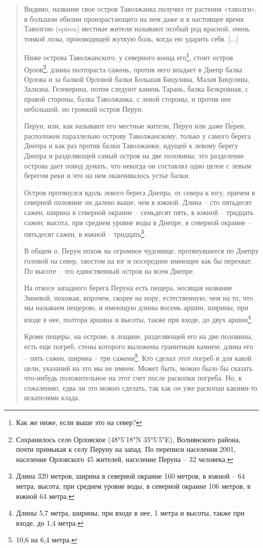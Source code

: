 \begin{quotation}
Видимо, название свое остров Таволжанка получил от растения «таволги», в большом обилии произрастающего на нем даже и в настоящее время. Таволгою (spirea) местные жители называют особый род красной, очень тонкой лозы, производящей жуткую боль, когда ею ударить себя. [...]

Ниже острова Таволжанского, у северного конца его\footnote{Как же ниже, если выше это на север?}, стоит остров Орлов\footnote{Сохранилось село Орловское (48°5'18"N 35°5'5"E), Волнянского района, почти примыкая к селу Перуну на запад. По переписи населения 2001, население Орловского 45 жителей, население Перуна – 32 человека.}, длины полтораста сажень, против него впадает в Днепр балка Орлова и за балкой Орловой балки Большая Бицулина, Малая Бицулина, Зализна, Гелеверина, потом следуют камень Тарань, балка Безкровная, с правой стороны, балка Таволжанка, с левой стороны, и против нее небольшой, но громкий остров Перун.

Перун, или, как называют его местные жители, П\'ерун или даже П\'ерен, расположен параллельно острову Таволжанскому, только у самого берега Днепра и как раз против балки Таволжанки, идущей к левому берегу Днепра и разделяющей самый остров на две половины; это разделение острова дает повод думать, что некогда он составлял одно целое с левым берегом реки и что на нем оканчивалось устье балки.

Остров протянулся вдоль левого берега Днепра, от севера к югу, причем в северной половине он далеко выше, чем в южной. Длина – сто пятьдесят сажен, ширина в северной окраине – семьдесят пять, в южной – тридцать сажен; высота, при среднем уровне воды в Днепре, в северной окраине – пятьдесят сажен, в южной – тридцать\footnote{Длина 320 метров, ширина в северной окраине 160 метров, в южной – 64 метра, высота, при среднем уровне воды, в северной окраине 106 метров, в южной 64 метра.}.

В общем о. Перун похож на огромное чудовище, протянувшееся по Днепру головой на север, хвостом на юг и посередине имеющее как бы перехват. По высоте – это единственный остров на всем Днепре.

На откосе западного берега Перуна есть пещера, носящая название Змиевой, похожая, впрочем, скорее на нору, естественную, чем на то, что мы называем пещерою, и имеющую длины восемь аршин, ширины, при входе в нее, полтора аршина и высоты, также при входе, до двух аршин\footnote{Длины 5,7 метра, ширины, при входе в нее, 1 метра и высоты, также при входе, до 1,4 метра.}.

Кроме пещеры, на острове, в лощине, разделяющей его на две половины, есть еще погреб, стены которого выложены гранитным камнем; длина его – пять сажен, ширина – три сажени\footnote{10,6 на 6,4 метра.}. Кто сделал этот погреб и для какой цели, указаний на это мы не имеем. Может быть, можно было бы сказать что-нибудь положительное на этот счет после раскопки погреба. Но, к сожалению, едва ли это можно сделать, так как он уже раскопан какими-то искателями клада.


\end{quotation}
